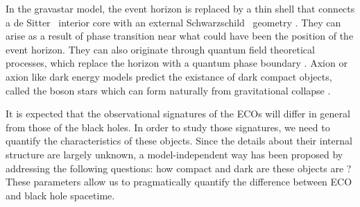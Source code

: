 \documentclass[aps,prd,twocolumn,floatfix,noshowpacs,tightenlines,noshowkeys,superscriptaddress,amsmath,amssymb,
nofootinbib]{revtex4-1}
\renewcommand\[{\begin{equation}}
\renewcommand\]{\end{equation}}
\def\Schld{Schwarzschild }
\def\dS{de Sitter }
\begin{document}
 In the gravastar model, the event horizon is replaced by a thin shell that connects a \dS\ interior core with an external \Schld\ geometry \cite{Chapline:2000en,Mazur:2004fk,Visser:2003ge}. They can arise as a result of phase transition near what could have been the position of the event horizon. They can also originate through quantum field theoretical processes, which replace the horizon with a quantum phase boundary \cite{Mottola:2006ew,Mottola:2011ud,Kawai:2017txu}.
   Axion or axion like dark energy models predict the existance of dark compact objects, called the boson stars which can form naturally from gravitational collapse \cite{Brito:2015yga, Liebling:2012fv, Seidel:1993zk}. \par
 It is expected that the observational signatures of the ECOs will differ in general from those of the black holes. In order to study those signatures, we need to quantify the characteristics of these objects. Since the details about their internal structure are largely unknown, a model-independent way has been proposed by addressing the following questions: how compact and dark are these objects are \cite{Cardoso:2019rvt,Maggio:2020jml}?  These parameters allow us to pragmatically quantify the difference between ECO and black hole spacetime.
\end{document}

